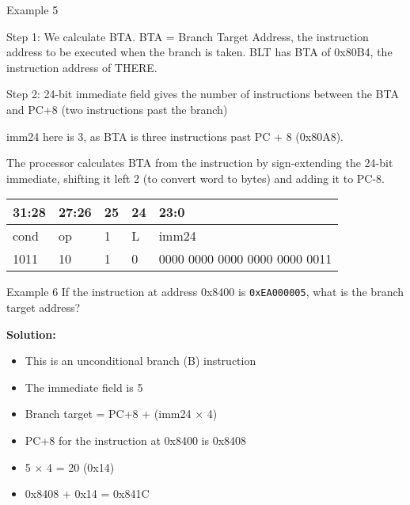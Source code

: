 \documentclass[aspectratio=169]{beamer}
\begin{document}
\begin{frame}{Example 5}

    Step 1: We calculate BTA. BTA = Branch Target Address, the instruction address to be executed when the branch is
    taken. BLT has BTA of 0x80B4, the instruction address of THERE.

    \vspace{0.5em}

    Step 2: 24-bit immediate field gives the number of instructions between the BTA and PC+8 (two
    instructions past the branch)
    
    \vspace{0.5em}

    imm24 here is 3, as BTA is three instructions past PC + 8 (0x80A8).

    \vspace{0.5em}

    The processor calculates BTA from the instruction by sign-extending the 24-bit
    immediate, shifting it left 2 (to convert word to bytes) and adding it to PC-8. 

    \begin{center}
        \renewcommand{\arraystretch}{1.2}
        \begin{tabular}{|p{4.0em}|p{4.0em}|p{3.5em}|p{4.5em}|p{14.0em}|}
        \hline
        31:28 & 27:26 & 25 & 24 & 23:0\\
        \hline
        cond & op & 1 & L & imm24 \\
        \hline
        1011 & 10 & 1 & 0 & 0000 0000 0000 0000 0000 0011\\
        \hline
        \end{tabular}
    \end{center}

    
\end{frame}


\begin{frame}{Example 6}
    If the instruction at address 0x8400 is \texttt{0xEA000005}, what is the branch target address?

    \textbf{Solution:}

    \begin{itemize}
        \item This is an unconditional branch (B) instruction
        \item The immediate field is 5
    \item Branch target = PC+8 + (imm24 × 4)
    \item PC+8 for the instruction at 0x8400 is 0x8408
    \item 5 $\times$ 4 = 20 (0x14)
    \item 0x8408 + 0x14 = 0x841C
    \end{itemize}
\end{frame}
\end{document}
